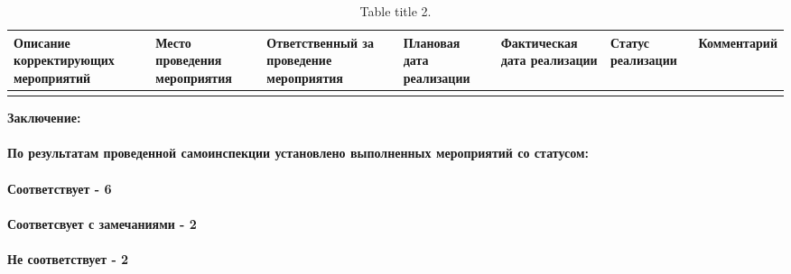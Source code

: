 {\small \begin{center}
\tabulinesep=2mm
\begin{longtabu} to \textwidth { X[1,l,p] X[0.3,l,p]  X[0.4,l,p]  X[0.25,l,p]  X[0.25,l,p]  X[0.25,l,p] X[0.25,l,p] }  %
\hline\hline
\textbf{Описание корректирующих мероприятий} & \textbf{Место проведения мероприятия} & \textbf{Ответственный за проведение мероприятия}  & \textbf{Плановая дата реализации} & \textbf{Фактическая дата реализации}  & \textbf{Статус реализации}   & \textbf{Комментарий}   \\ \hline
\endfirsthead
\hline
\endfoot
\caption{Table title 2.}
\endlastfoot


\end{longtabu}
\end{center}
}

{\large \textbf{Заключение:}}

\paragraph{По результатам проведенной самоинспекции установлено выполненных мероприятий со статусом:}

\paragraph{\textbf{Соответствует - 6}}
\paragraph{\textbf{Соответсвует с замечаниями - 2}}
\paragraph{\textbf{Не соответствует - 2}}



